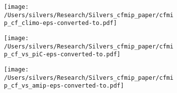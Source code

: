 \documentclass[varwidth, border=10pt]{standalone}
\begin{document}
\begin{figure}
  \centering
  \begin{subfigure}{0.31\textwidth}
    \texttt{[image: /Users/silvers/Research/Silvers\_cfmip\_paper/cfmip\_cf\_climo-eps-converted-to.pdf]}
\end{subfigure}
\begin{subfigure}{0.31\textwidth}
  \texttt{[image: /Users/silvers/Research/Silvers\_cfmip\_paper/cfmip\_cf\_vs\_piC-eps-converted-to.pdf]}
\end{subfigure}
\begin{subfigure}{0.31\textwidth}
  \texttt{[image: /Users/silvers/Research/Silvers\_cfmip\_paper/cfmip\_cf\_vs\_amip-eps-converted-to.pdf]}
\end{subfigure}
\end{figure}
\end{document}

